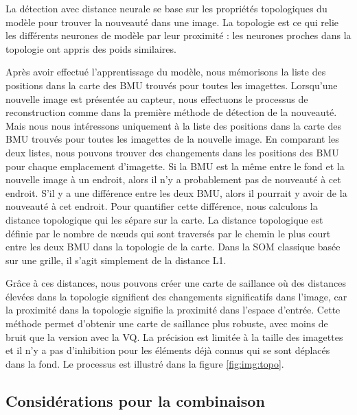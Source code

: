 	La détection avec distance neurale se base sur les propriétés topologiques du modèle pour trouver la nouveauté dans une image. La topologie est ce qui relie les différents neurones de modèle par leur proximité : les neurones proches dans la topologie ont appris des poids similaires.

	Après avoir effectué l'apprentissage du modèle, nous mémorisons la liste des positions dans la carte des BMU trouvés pour toutes les imagettes. Lorsqu'une nouvelle image est présentée au capteur, nous effectuons le processus de reconstruction comme dans la première méthode de détection de la nouveauté. Mais nous nous intéressons uniquement à la liste des positions dans la carte des BMU trouvés pour toutes les imagettes de la nouvelle image. En comparant les deux listes, nous pouvons trouver des changements dans les positions des BMU pour chaque emplacement d'imagette. Si la BMU est la même entre le fond et la nouvelle image à un endroit, alors il n'y a probablement pas de nouveauté à cet endroit. S'il y a une différence entre les deux BMU, alors il pourrait y avoir de la nouveauté à cet endroit. Pour quantifier cette différence, nous calculons la distance topologique qui les sépare sur la carte. La distance topologique est définie par le nombre de nœuds qui sont traversés par le chemin le plus court entre les deux BMU dans la topologie de la carte. Dans la SOM classique basée sur une grille, il s'agit simplement de la distance L1.

	Grâce à ces distances, nous pouvons créer une carte de saillance où des distances élevées dans la topologie signifient des changements significatifs dans l'image, car la proximité dans la topologie signifie la proximité dans l'espace d'entrée. Cette méthode permet d'obtenir une carte de saillance plus robuste, avec moins de bruit que la version avec la VQ. La précision est limitée à la taille des imagettes et il n'y a pas d'inhibition pour les éléments déjà connus qui se sont déplacés dans la fond. Le processus est illustré dans la figure \ref{fig:img:topo}.

	\subsection{Considérations pour la combinaison}
	

